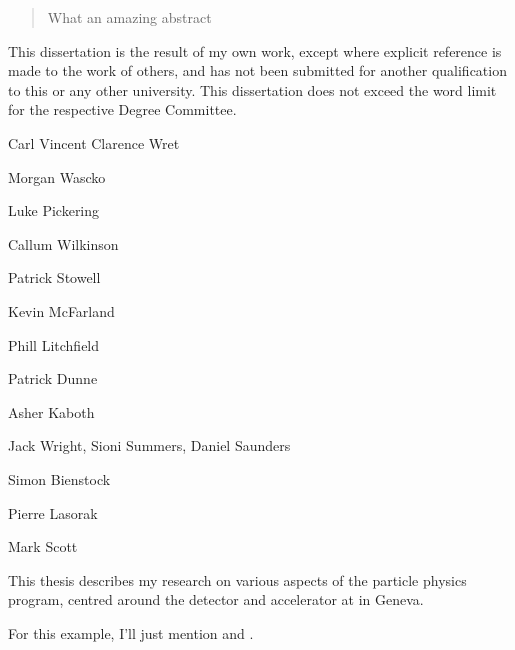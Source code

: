 
\begin{abstract}%
  What an amazing abstract
\end{abstract}

\begin{declaration}
  This dissertation is the result of my own work, except where explicit
  reference is made to the work of others, and has not been submitted
  for another qualification to this or any other university. This
  dissertation does not exceed the word limit for the respective Degree
  Committee.
  \vspace*{1cm}
  \begin{flushright}
    Carl Vincent Clarence Wret
  \end{flushright}
\end{declaration}


\begin{acknowledgements}
  Morgan Wascko
  
  Luke Pickering
  
  Callum Wilkinson
  
  Patrick Stowell
  
  Kevin McFarland
  
  Phill Litchfield
  
  Patrick Dunne
  
  Asher Kaboth
  
  Jack Wright, Sioni Summers, Daniel Saunders
  
  Simon Bienstock
  
  Pierre Lasorak
  
  Mark Scott
\end{acknowledgements}

\begin{preface}
  This thesis describes my research on various aspects of the \LHCb
  particle physics program, centred around the \LHCb detector and \LHC
  accelerator at \CERN in Geneva.

  \noindent
  For this example, I'll just mention  and .
\end{preface}
\tableofcontents


\thispagestyle{empty}
